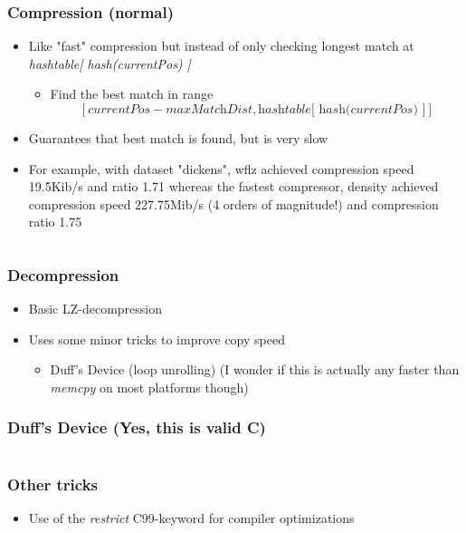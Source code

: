 \documentclass{beamer}
\begin{document}
\begin{frame}
	\frametitle{Compression (normal)}
	
	\begin{itemize}
		\item Like "fast" compression but instead of only checking longest match at \textit{hashtable[ hash(currentPos) ]}
		\begin{itemize}
			\item Find the best match in range \[ [\textit{currentPos} - \textit{maxMatchDist}, \textit{hashtable[ hash(currentPos) ]}] \]
		\end{itemize}
		\item Guarantees that best match is found, but is very slow
		\item For example, with dataset "dickens", wflz achieved compression speed 19.5Kib/s and ratio 1.71 whereas the fastest compressor, density achieved compression speed 227.75Mib/s (4 orders of magnitude!) and compression ratio 1.75
	\end{itemize}		 

\end{frame}

\begin{frame}
	\inputminted[fontsize=\footnotesize, tabsize=2, firstline=356, lastline=374, breaklines]{c}{wflz/wfLZ.c}	
\end{frame}


\begin{frame}
	\frametitle{Decompression}
	
	\begin{itemize}
		\item Basic LZ-decompression
		\item Uses some minor tricks to improve copy speed
		\begin{itemize}
			\item Duff's Device (loop unrolling) (I wonder if this is actually any faster than \textit{memcpy} on most platforms though)
			
		\end{itemize}		

	\end{itemize}
		
\end{frame}

\begin{frame}
	\frametitle{Duff's Device (Yes, this is valid C)}	
	
	\inputminted[fontsize=\footnotesize, tabsize=2, firstline=582, lastline=594, breaklines]{c}{wflz/wfLZ.c}	
	
\end{frame}


\begin{frame}
	\frametitle{Other tricks}
	\begin{itemize}
		\item Use of the \textit{restrict} C99-keyword for compiler optimizations 
	\end{itemize}
\end{frame}
\end{document}
